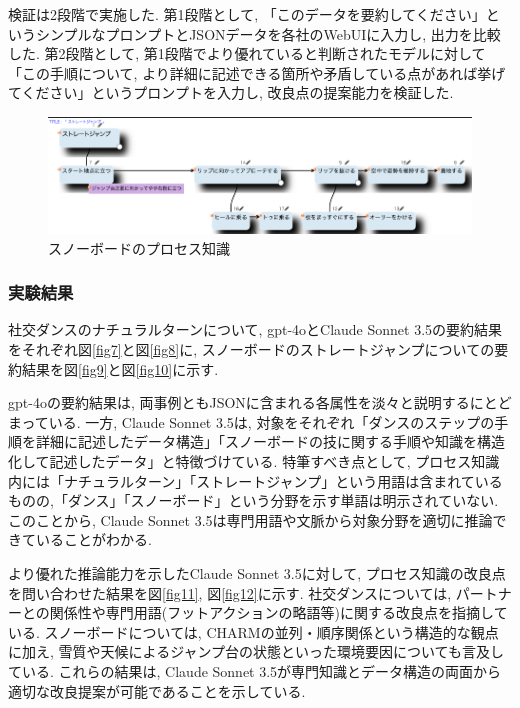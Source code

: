 検証は2段階で実施した. 第1段階として, 「このデータを要約してください」というシンプルなプロンプトとJSONデータを各社のWebUIに入力し, 出力を比較した. 第2段階として, 第1段階でより優れていると判断されたモデルに対して「この手順について, より詳細に記述できる箇所や矛盾している点があれば挙げてください」というプロンプトを入力し, 改良点の提案能力を検証した.

\begin{figure}[htbp]
    \centering
    \includegraphics[width=1.0\linewidth]{./image/charm_straight_jump.png}
    \caption{スノーボードのプロセス知識}
    \label{fig6}
\end{figure}


\subsubsection{実験結果}
社交ダンスのナチュラルターンについて, gpt-4oとClaude Sonnet 3.5の要約結果をそれぞれ図\ref{fig7}と図\ref{fig8}に, スノーボードのストレートジャンプについての要約結果を図\ref{fig9}と図\ref{fig10}に示す.

gpt-4oの要約結果は, 両事例ともJSONに含まれる各属性を淡々と説明するにとどまっている. 一方, Claude Sonnet 3.5は, 対象をそれぞれ「ダンスのステップの手順を詳細に記述したデータ構造」「スノーボードの技に関する手順や知識を構造化して記述したデータ」と特徴づけている. 特筆すべき点として, プロセス知識内には「ナチュラルターン」「ストレートジャンプ」という用語は含まれているものの,「ダンス」「スノーボード」という分野を示す単語は明示されていない. このことから, Claude Sonnet 3.5は専門用語や文脈から対象分野を適切に推論できていることがわかる.

より優れた推論能力を示したClaude Sonnet 3.5に対して, プロセス知識の改良点を問い合わせた結果を図\ref{fig11}, 図\ref{fig12}に示す. 社交ダンスについては, パートナーとの関係性や専門用語(フットアクションの略語等)に関する改良点を指摘している. スノーボードについては, CHARMの並列・順序関係という構造的な観点に加え, 雪質や天候によるジャンプ台の状態といった環境要因についても言及している. これらの結果は, Claude Sonnet 3.5が専門知識とデータ構造の両面から適切な改良提案が可能であることを示している.

